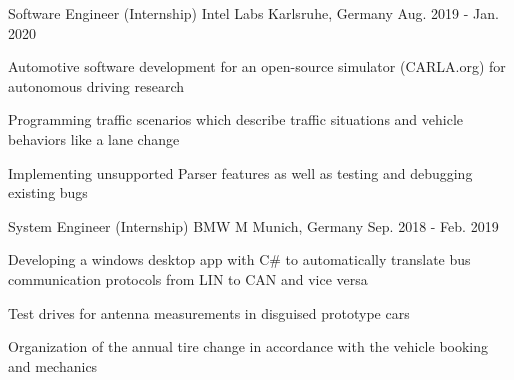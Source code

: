 \begin{cventries}
  \cventry
    {Software Engineer (Internship)} %
    {Intel Labs} %
    {Karlsruhe, Germany} %
    {Aug. 2019 - Jan. 2020} %
    {
      \begin{cvitems} %
      \item {Automotive software development for an open-source simulator (CARLA.org) for autonomous driving research}
        \item {Programming traffic scenarios which describe traffic situations and vehicle behaviors like a lane change}
        \item{Implementing unsupported Parser features as well as testing and debugging existing bugs}
      \end{cvitems}
    }

  \cventry
    {System Engineer (Internship)} %
    {BMW M} %
    {Munich, Germany} %
    {Sep. 2018 - Feb. 2019} %
    {
      \begin{cvitems} %
        \item {Developing a windows desktop app with C\# to automatically translate bus communication protocols from LIN to CAN and vice versa}
        \item {Test drives for antenna measurements in disguised prototype cars}
        \item {Organization of the annual tire change in accordance with the vehicle booking and mechanics}
      \end{cvitems}
    }
\end{cventries}